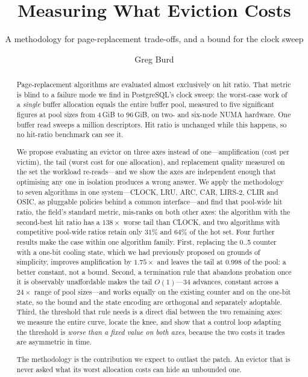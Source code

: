 \documentclass[sigconf,nonacm]{acmart}
\begin{document}
\title{Measuring What Eviction Costs}
\subtitle{A methodology for page-replacement trade-offs, and a bound for the clock sweep}

\author{Greg Burd}
\affiliation{\institution{}\city{}\country{}}

\begin{abstract}
Page-replacement algorithms are evaluated almost exclusively on hit ratio.
That metric is blind to a failure mode we find in PostgreSQL's clock sweep: the
worst-case work of a \emph{single} buffer allocation equals the entire buffer
pool, measured to five significant figures at pool sizes from 4\,GiB to
96\,GiB, on two- and six-node NUMA hardware. One buffer read sweeps a million
descriptors. Hit ratio is unchanged while this happens, so no hit-ratio
benchmark can see it.

We propose evaluating an evictor on three axes instead of one---amplification
(cost per victim), the tail (worst cost for one allocation), and replacement
quality measured on the set the workload re-reads---and we show the axes are
independent enough that optimising any one in isolation produces a wrong
answer. We apply the methodology to seven algorithms in one
system---CLOCK, LRU, ARC, CAR, LIRS-2, CLIR and OSIC, as pluggable policies
behind a common interface---and find that pool-wide hit ratio, the field's
standard metric, mis-ranks on both other axes: the algorithm with the
second-best hit ratio has a $138\times$ worse tail than CLOCK, and two
algorithms with competitive pool-wide ratios retain only $31\%$ and $64\%$ of
the hot set. Four further results make the case within one algorithm family. First, replacing the 0..5 counter with a one-bit cooling state,
which we had previously proposed on grounds of simplicity, improves
amplification by $1.75\times$ and leaves the tail at $0.998$ of the pool: a
better constant, not a bound. Second, a termination rule that abandons
probation once it is observably unaffordable makes the tail $O(1)$---$34$
advances, constant across a $24\times$ range of pool sizes---and works equally
on the existing counter and on the one-bit state, so the bound and the state
encoding are orthogonal and separately adoptable. Third, the threshold that
rule needs is a direct dial between the two remaining axes: we measure the
entire curve, locate the knee, and show that a control loop adapting the
threshold is \emph{worse than a fixed value on both axes}, because the two
costs it trades are asymmetric in time.

The methodology is the contribution we expect to outlast the patch. An evictor
that is never asked what its worst allocation costs can hide an unbounded one.
\end{abstract}
\end{document}
